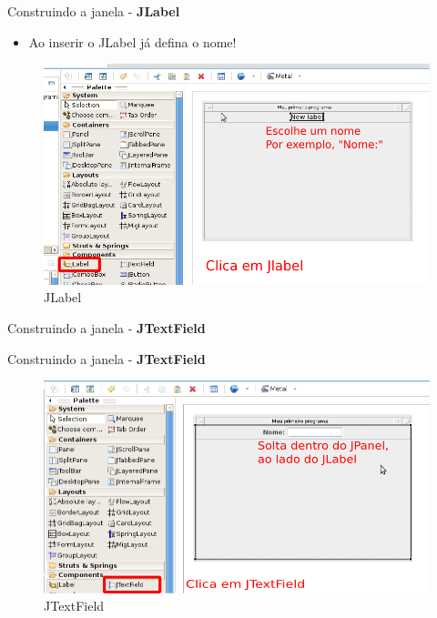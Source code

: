 \documentclass[10pt]{beamer}
\begin{document}
\begin{frame}{Construindo a janela - \textbf{JLabel}}
\begin{itemize}
\item Ao inserir o JLabel já defina o nome!
\end{itemize}
\begin{figure}[!htb]
    \centering
    \includegraphics[scale=.4]{jlabel}
    \caption{JLabel}
    \label{figRotulo}
  \end{figure}
\end{frame}{}

\begin{frame}{Construindo a janela - \textbf{JTextField}}
\end{frame}{}

\begin{frame}{Construindo a janela - \textbf{JTextField}}
\begin{figure}[!htb]
    \centering
    \includegraphics[scale=.4]{jtextfield}
    \caption{JTextField}
    \label{figRotulo}
  \end{figure}
\end{frame}{}
\end{document}
